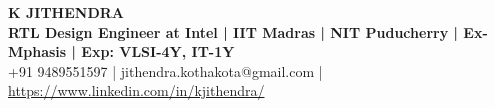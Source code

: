 \documentclass[a4paper,11pt]{article}
\begin{document}
\begin{center}
\LARGE { \uppercase {\textbf{K Jithendra}}}\\
\large \textbf{{RTL Design Engineer at Intel | IIT Madras | NIT Puducherry | Ex-Mphasis | Exp: VLSI-4Y, IT-1Y}}\\
\large {+91 9489551597 | jithendra.kothakota@gmail.com | \href{https://www.linkedin.com/in/kjithendra/}{https://www.linkedin.com/in/kjithendra/}} \\
\end{center}



\end{document}
